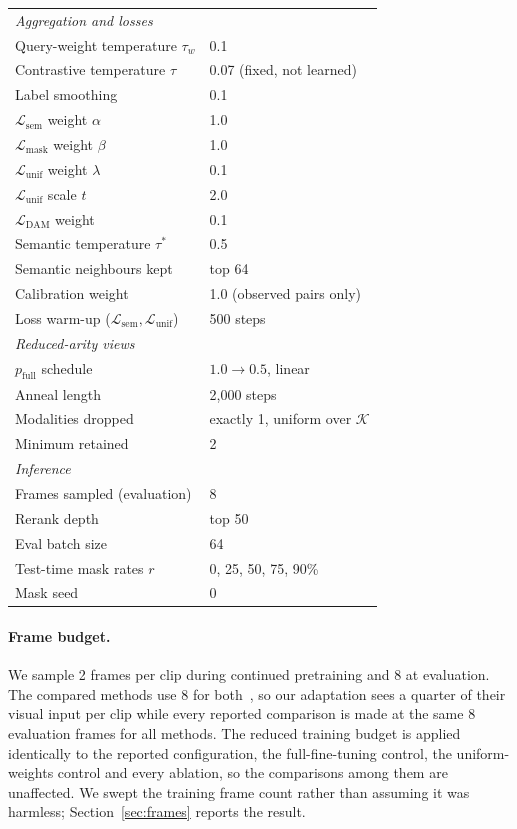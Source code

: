\documentclass[10pt,twocolumn,letterpaper]{article}
\begin{document}
\begin{table}[t]
\begin{tabular}{ll}
\midrule
\multicolumn{2}{l}{\emph{Aggregation and losses}} \\
Query-weight temperature $\tau_w$ & 0.1 \\
Contrastive temperature $\tau$ & 0.07 (fixed, not learned) \\
Label smoothing & 0.1 \\
$\mathcal{L}_{\mathrm{sem}}$ weight $\alpha$ & 1.0 \\
$\mathcal{L}_{\mathrm{mask}}$ weight $\beta$ & 1.0 \\
$\mathcal{L}_{\mathrm{unif}}$ weight $\lambda$ & 0.1 \\
$\mathcal{L}_{\mathrm{unif}}$ scale $t$ & 2.0 \\
$\mathcal{L}_{\mathrm{DAM}}$ weight & 0.1 \\
Semantic temperature $\tau^*$ & 0.5 \\
Semantic neighbours kept & top 64 \\
Calibration weight & 1.0 (observed pairs only) \\
Loss warm-up ($\mathcal{L}_{\mathrm{sem}},\mathcal{L}_{\mathrm{unif}}$) & 500 steps \\
\midrule
\multicolumn{2}{l}{\emph{Reduced-arity views}} \\
$p_{\mathrm{full}}$ schedule & $1.0 \rightarrow 0.5$, linear \\
Anneal length & 2{,}000 steps \\
Modalities dropped & exactly 1, uniform over $\mathcal{K}$ \\
Minimum retained & 2 \\
\midrule
\multicolumn{2}{l}{\emph{Inference}} \\
Frames sampled (evaluation) & 8 \\
Rerank depth & top 50 \\
Eval batch size & 64 \\
Test-time mask rates $r$ & 0, 25, 50, 75, 90\% \\
Mask seed & 0 \\
\bottomrule
\end{tabular}
\end{table}

\paragraph{Frame budget.}
We sample 2 frames per clip during continued pretraining and 8 at evaluation.
The compared methods use 8 for both~\cite{cicchetti2025gramian}, so our
adaptation sees a quarter of their visual input per clip while every reported
comparison is made at the same 8 evaluation frames for all methods. The
reduced training budget is applied identically to the reported configuration,
the full-fine-tuning control, the uniform-weights control and every ablation,
so the comparisons among them are unaffected. We swept the training frame
count rather than assuming it was harmless; Section~\ref{sec:frames} reports
the result.
\end{document}
